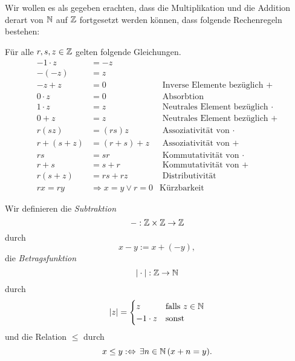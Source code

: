 Wir wollen es als gegeben erachten, dass die Multiplikation und die Addition derart von $\mathbb{N}$ auf $\mathbb{Z}$ fortgesetzt werden können, dass folgende Rechenregeln bestehen:

\begin{rk}
Für alle $r,s,z\in\mathbb{Z}$ gelten folgende Gleichungen.
\begin{align*}
-1\cdot z&=-z\\
-(-z)&=z\\
-z+z&=0 &\text{ Inverse Elemente bezüglich }+\\
0\cdot z&=0 &\text{ Absorbtion}\\
1\cdot z&=z &\text{ Neutrales Element bezüglich }\cdot\\
0+z&=z &\text{ Neutrales Element bezüglich }+\\
r(sz)&=(rs)z &\text{ Assoziativität von } \cdot\\
r+(s+z)&=(r+s)+z &\text{ Assoziativität von }+\\
rs&=sr &\text{ Kommutativität von }\cdot\\
r+s&=s+r &\text{ Kommutativität von }+\\
r(s+z)&=rs+rz &\text{ Distributivität}\\
rx=ry&\Rightarrow x=y\lor r=0&\text{Kürzbarkeit}
\end{align*}
\end{rk}

\begin{df}
 Wir definieren die \textit{Subtraktion}
\[
 -:\mathbb{Z}\times\mathbb{Z}\rightarrow\mathbb{Z}
\]
durch
\[
 x-y:=x+(-y),
\]
die \textit{Betragsfunktion}
\[
 |\cdot|:\mathbb{Z}\rightarrow\mathbb{N}
\]
durch
\[
 |z|=\begin{cases}
      z&\text{falls } z\in\mathbb{N}\\
      -1\cdot z&\text{sonst}
     \end{cases}
\]
und die Relation $\leq$ durch
\[
x\leq y:\Leftrightarrow\,\exists n\in\mathbb{N}\,(x+n=y).
\]
\end{df}



